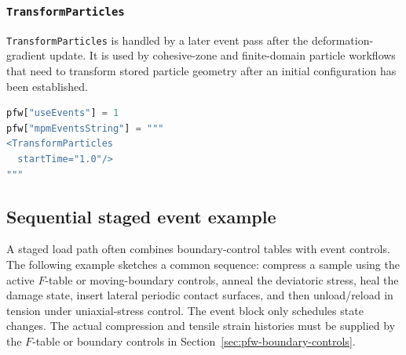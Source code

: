\subsubsection{\texttt{TransformParticles}}

\texttt{TransformParticles} is handled by a later event pass after the deformation-gradient update.  It is used by cohesive-zone and finite-domain particle workflows that need to transform stored particle geometry after an initial configuration has been established.

\begin{lstlisting}[language=Python,caption={Transform-particles event.}]
pfw["useEvents"] = 1
pfw["mpmEventsString"] = """
<TransformParticles
  startTime="1.0"/>
"""
\end{lstlisting}

\subsection{Sequential staged event example}
\label{sec:pfw-sequential-events-example}

A staged load path often combines boundary-control tables with event controls.  The following example sketches a common sequence: compress a sample using the active \(F\)-table or moving-boundary controls, anneal the deviatoric stress, heal the damage state, insert lateral periodic contact surfaces, and then unload/reload in tension under uniaxial-stress control.  The event block only schedules state changes.  The actual compression and tensile strain histories must be supplied by the \(F\)-table or boundary controls in Section~\ref{sec:pfw-boundary-controls}.

